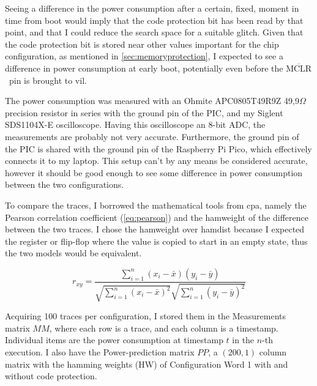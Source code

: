 \documentclass[a4paper,english,twoside,10pt]{article}
\newcommand{\mclr}{\(\overline{\mbox{MCLR}}\)\ }
\begin{document}
Seeing a difference in the power consumption after a certain, fixed, moment in time from boot would imply that the code protection bit has been read by that point, and that I could reduce the search space for a suitable glitch. Given that the code protection bit is stored near other values important for the chip configuration, as mentioned in \cref{sec:memoryprotection}, I expected to see a difference in power consumption at early boot, potentially even before the \mclr pin is brought to \gls{vil}.

The power consumption was measured with an Ohmite APC0805T49R9Z 49,9$\Omega$ precision resistor in series with the ground pin of the PIC, and my Siglent SDS1104X-E oscilloscope. Having this oscilloscope an 8-bit ADC, the measurements are probably not very accurate. Furthermore, the ground pin of the PIC is shared with the ground pin of the Raspberry Pi Pico, which effectively connects it to my laptop. This setup can't by any means be considered accurate, however it should be good enough to see some difference in power consumption between the two configurations.

To compare the traces, I borrowed the mathematical tools from \gls{cpa}, namely the Pearson correlation coefficient (\cref{eq:pearson}) and the \gls{hamweight} of the difference between the two traces. I chose the \gls{hamweight} over \gls{hamdist} because I expected the register or flip-flop where the value is copied to start in an empty state, thus the two models would be equivalent.

\begin{equation}\label{eq:pearson}
	r_{xy} =\frac{\sum ^n _{i=1}(x_i - \bar{x})(y_i - \bar{y})}{\sqrt{\sum ^n _{i=1}(x_i - \bar{x})^2} \sqrt{\sum ^n _{i=1}(y_i - \bar{y})^2}}
\end{equation}

Acquiring 100 traces per configuration, I stored them in the Measurements matrix \(MM\), where each row is a trace, and each column is a timestamp. Individual items are the power consumption at timestamp \(t\) in the \(n\)-th execution. I also have the Power-prediction matrix \(PP\), a \((200, 1)\) column matrix with the hamming weights (HW) of Configuration Word 1 with and without code protection.
\end{document}
